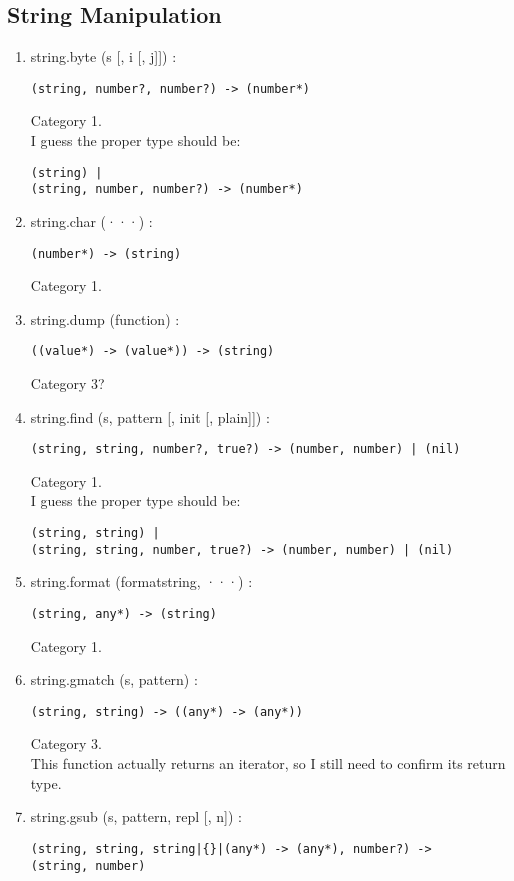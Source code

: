 \documentclass{paper}
\begin{document}
\subsection{String Manipulation}

\begin{enumerate}
\item string.byte (s [, i [, j]]) :
\begin{verbatim}
(string, number?, number?) -> (number*)
\end{verbatim}
Category 1.
\\
I guess the proper type should be:
\begin{verbatim}
(string) |
(string, number, number?) -> (number*)
\end{verbatim}
\item string.char (···) :
\begin{verbatim}
(number*) -> (string)
\end{verbatim}
Category 1.
\item string.dump (function) :
\begin{verbatim}
((value*) -> (value*)) -> (string)
\end{verbatim}
Category 3?
\item string.find (s, pattern [, init [, plain]]) :
\begin{verbatim}
(string, string, number?, true?) -> (number, number) | (nil)
\end{verbatim}
Category 1.
\\
I guess the proper type should be:
\begin{verbatim}
(string, string) |
(string, string, number, true?) -> (number, number) | (nil)
\end{verbatim}
\item string.format (formatstring, ···) :
\begin{verbatim}
(string, any*) -> (string)
\end{verbatim}
Category 1.
\item string.gmatch (s, pattern) :
\begin{verbatim}
(string, string) -> ((any*) -> (any*))
\end{verbatim}
Category 3.
\\
This function actually returns an iterator,
so I still need to confirm its return type.
\item string.gsub (s, pattern, repl [, n]) :
\begin{verbatim}
(string, string, string|{}|(any*) -> (any*), number?) ->
(string, number)
\end{verbatim}

\end{enumerate}
\end{document}
